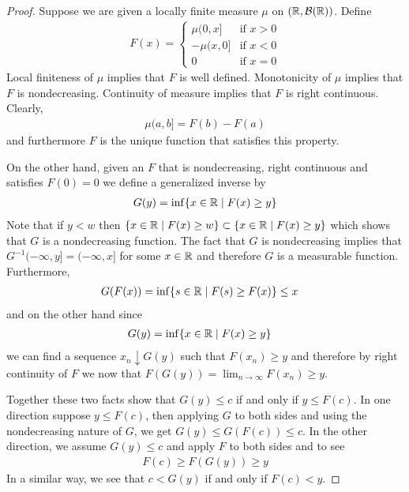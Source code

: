 \documentclass{amsart}
\theoremstyle{remark}
\theoremstyle{definition}
\begin{document}
\begin{proof}
Suppose we are given a locally finite measure $\mu$ on
$(\mathbb{R},\mathcal{B}(\mathbb{R}))$.  Define
\begin{align*}
F(x) = \begin{cases}
\mu (0,x] & \text{if $x > 0$}\\
-\mu (x, 0] & \text{if $x < 0$}\\
0 & \text{if $x=0$}
\end{cases}
\end{align*}
Local finiteness of $\mu$ implies that $F$ is well defined.
Monotonicity of $\mu$ implies that $F$ is nondecreasing.  Continuity
of measure implies that $F$ is right continuous.  Clearly, 
\begin{align*}
\mu (a,b] = F(b) - F(a)
\end{align*} and furthermore $F$ is the unique function that satisfies
this property.

On the other hand, given an $F$ that is nondecreasing, right
continuous and satisfies $F(0) = 0$ we define a generalized inverse by 
\begin{align*}
G(y) = \inf \lbrace x \in \mathbb{R} \mid F(x) \geq y \rbrace
\end{align*}
Note that if $y < w$ then $\lbrace x \in \mathbb{R} \mid F(x) \geq w
\rbrace \subset \lbrace x \in \mathbb{R} \mid F(x) \geq y \rbrace$ which
shows that $G$ is a nondecreasing function.  The fact that $G$ is
nondecreasing implies that $G^{-1} (-\infty, y] = (-\infty, x]$ for
some $x \in \mathbb{R}$ and therefore $G$ is a measurable function.
Furthermore, 
\begin{align*}
G(F(x)) &= \inf\lbrace s \in \mathbb{R} \mid F(s) \geq F(x)
\rbrace \leq x
\end{align*}
and on the other hand since 
\begin{align*}
G(y) &= \inf\lbrace x \in \mathbb{R} \mid F(x) \geq y
\rbrace 
\end{align*}
we can find a sequence $x_n \downarrow G(y)$ such that $F(x_n) \geq y$
and therefore by right continuity of $F$ we now that $F(G(y)) =
\lim_{n\to\infty} F(x_n) \geq y$.

Together these two facts show that 
$G(y) \leq c$ if and only if $y \leq F(c)$.  In one direction suppose
$y \leq F(c)$, then applying $G$ to both sides and using the
nondecreasing nature of $G$, we get $G(y) \leq G(F(c)) \leq c$.  In
the other direction, we assume $G(y) \leq c$ and apply $F$ to both
sides and to see
\begin{align*}
F(c) \geq F(G(y)) \geq y
\end{align*}
In a similar way, we see that $c < G(y)$ if and only if $F(c) < y$.


\end{proof}
\end{document}
